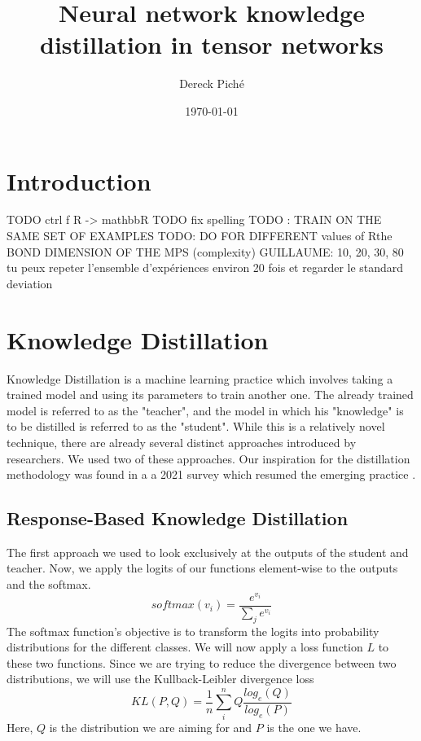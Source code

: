 \documentclass{article}
\title{Neural network knowledge distillation in tensor networks}
\author{Dereck Piché}
\date{\today}
\theoremstyle{definition}
\theoremstyle{definition}
\begin{document}
\maketitle

\begin{abstract}
\end{abstract}

\section{Introduction}
TODO ctrl f R -> mathbb{R}
TODO fix spelling
TODO : TRAIN ON THE SAME SET OF EXAMPLES
TODO: DO FOR DIFFERENT values of Rthe BOND DIMENSION OF THE MPS (complexity)
GUILLAUME: 10, 20, 30, 80
tu peux repeter l'ensemble d'expériences environ 20 fois et regarder le standard deviation



\section{Knowledge Distillation}
Knowledge Distillation is a machine learning practice which involves
taking a trained model and using its parameters to train another one.
The already trained model is referred to as the "teacher", and 
the model in which his "knowledge" is to be distilled is referred to as
the "student". While this is a relatively novel technique, there are 
already several distinct approaches introduced by researchers.
We used two of these approaches. Our inspiration for the distillation 
methodology was found in a a 2021 survey which resumed the emerging 
practice \cite{Gou_2021}.

\subsection{Response-Based Knowledge Distillation}
The first approach we used to look exclusively at the outputs
of the student and teacher. Now, we apply the logits
of our functions element-wise to the outputs and the softmax.
\begin{equation}
    softmax(v_i) = \frac{e^{v_i}}{\sum_{j}{e^{v_i}}}
\end{equation}
The softmax function's objective is to transform the logits
into probability distributions for the different classes.
We will now apply a loss function $L$ to these two functions.
Since we are trying to reduce the divergence between 
two distributions, we will use the Kullback-Leibler divergence loss
\begin{equation}
    KL(P, Q) = \frac{1}{n} \sum_i^n Q \frac{log_e(Q)}{log_e(P)}
\end{equation}
Here, $Q$ is the distribution we are aiming for and $P$ is the one we have.
\end{document}
